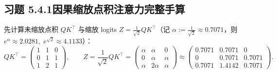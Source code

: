 \subsection*{习题 5.4.1\quad 因果缩放点积注意力完整手算}
先计算未缩放点积 $Q K^\top$ 与缩放 logits $Z = \frac{1}{\sqrt{2}} Q K^\top$（记 $\alpha := \frac{1}{\sqrt{2}} \approx 0.7071$，则 $e^{\alpha} \approx 2.0281,\; e^{\sqrt{2}} \approx 4.1133$）：
\[
  Q K^\top = \begin{pmatrix} 1 & 1 & 0 \\ 0 & 1 & 1 \\ 1 & 2 & 1 \end{pmatrix}, \qquad
  Z = \frac{1}{\sqrt{2}} Q K^\top = \begin{pmatrix}
    \alpha & \alpha & 0 \\
    0 & \alpha & \alpha \\
    \alpha & 2\alpha & \alpha
  \end{pmatrix}
  \approx \begin{pmatrix}
    0.7071 & 0.7071 & 0 \\
    0 & 0.7071 & 0.7071 \\
    0.7071 & 1.4142 & 0.7071
  \end{pmatrix}.
\]
